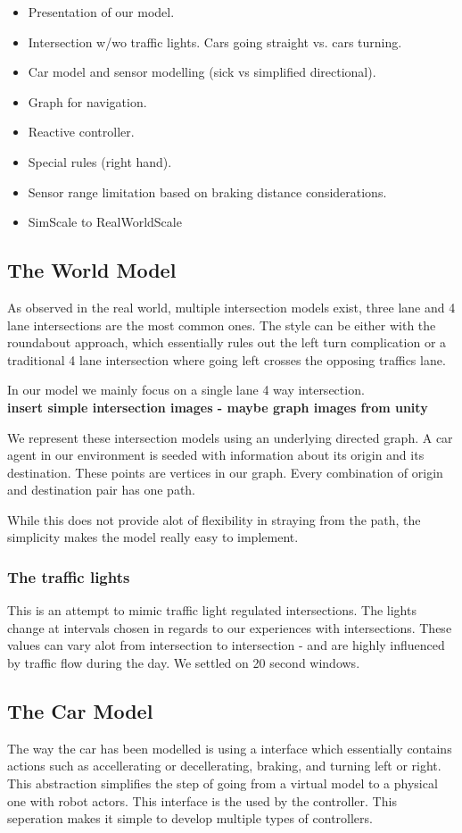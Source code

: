 \begin{itemize}
\item Presentation of our model.
\item Intersection w/wo traffic lights. Cars going straight vs. cars turning.
\item Car model and sensor modelling (sick vs simplified directional).
\item Graph for navigation.
\item Reactive controller.
\item Special rules (right hand).
\item Sensor range limitation based on braking distance considerations.
\item SimScale to RealWorldScale
\end{itemize}

\subsection{The World Model}
As observed in the real world, multiple intersection models exist, three lane and 4 lane intersections are the most common ones.
The style can be either with the roundabout approach, which essentially rules out the left turn complication or a traditional 4 lane intersection where going left crosses the opposing traffics lane.

In our model we mainly focus on a single lane 4 way intersection.\\
\textbf{insert simple intersection images - maybe graph images from unity}

We represent these intersection models using an underlying directed graph. A car agent in our environment is seeded with information about its origin and its destination.
These points are vertices in our graph. Every combination of origin and destination pair has one path.

While this does not provide alot of flexibility in straying from the path, the simplicity makes the model really easy to implement.

\subsubsection{The traffic lights}
This is an attempt to mimic traffic light regulated intersections. The lights change at intervals chosen in regards to our experiences with intersections. These values can vary alot from intersection to intersection - and are highly influenced by traffic flow during the day. We settled on 20 second windows.


\subsection{The Car Model}
The way the car has been modelled is using a interface which essentially contains actions such as accellerating or decellerating, braking, and turning left or right.
This abstraction simplifies the step of going from a virtual model to a physical one with robot actors.
This interface is the used by the controller. This seperation makes it simple to develop multiple types of controllers.